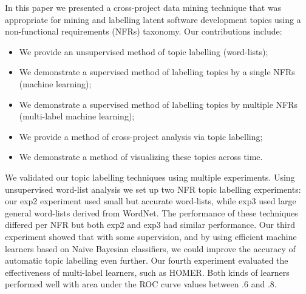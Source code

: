 \documentclass[]{sig-alternate}
\begin{document}

In this paper we presented a cross-project data mining technique that was appropriate for mining and labelling latent software development topics using a non-functional requirements (NFRs) taxonomy. %
Our contributions include:
\begin{itemize}
\item We provide an unsupervised method of topic labelling (word-lists);
\item We demonstrate a supervised method of labelling topics by a single NFRs (machine learning);
\item We demonstrate a supervised method of labelling topics by multiple NFRs (multi-label machine learning);
\item We provide a method of cross-project analysis via topic labelling;
\item We demonstrate a method of visualizing these topics across time.
\end{itemize}


We validated our topic labelling techniques using multiple experiments.
Using unsupervised word-list analysis we set up two NFR topic labelling experiments: 
our \textsf{exp2} experiment used small but accurate word-lists, while \textsf{exp3} used large general word-lists derived from WordNet.
The performance of these techniques differed per NFR but both \textsf{exp2} and \textsf{exp3} had similar performance.
Our third experiment showed that with some supervision, and by using efficient machine learners based on Naive Bayesian classifiers, we could improve the accuracy of automatic topic labelling even further.
Our fourth experiment evaluated the effectiveness of multi-label learners, such as HOMER. 
Both kinds of learners performed well with area under the ROC curve values between $.6$ and $.8$.
\end{document}
